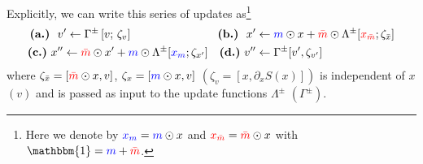 \documentclass[a4paper,11pt]{article}
\newcommand{\mask}{\textcolor{blue}{{m}}}
\newcommand{\maskbar}{\textcolor{red}{\bar{m}}}
\newcommand{\xmask}{\textcolor{blue}{{x}_{m}}}
\newcommand{\xmaskbar}{\textcolor{red}{x_{\bar{m}}}}
\begin{document}
Explicitly, we can write this series of updates as\footnote{%
  Here we denote by \(\xmask = \mask \odot x\) and 
  \(\xmaskbar = \maskbar \odot x\) with \(\mathbbm{1} = \mask + \maskbar\).
}
%
\begin{align}
    \nonumber
    \textbf{(a.)}\,\,\,\, v' 
        \gets \Gamma^{\pm}\left[v;\, \zeta_{v} \right]\hspace{75pt}
    \textbf{(b.)}\,\,\,\, x' 
        &\gets \mask \odot x + \maskbar \odot \Lambda^{\pm} [\xmaskbar; \zeta_{\bar{x}}] \\
    \nonumber
    \textbf{(c.)}\,\, x'' 
        \gets \maskbar \odot x' + \mask \odot \Lambda^{\pm} [\xmask; \zeta_{x'}] \quad
    \textbf{(d.)}\,\, v'' 
        &\gets \Gamma^{\pm} [v', \zeta_{v'}]
\end{align}
%
where \(\zeta_{\bar{x}} = [\maskbar\odot x, v]\), \(\zeta_{x} = [\mask \odot x,
v]\) \((\zeta_{v} = [x, \partial_{x} S(x)])\) is independent of \(x\) \((v)\)
and is passed as input to the update functions \(\Lambda^{\pm}\)
\((\Gamma^{\pm})\).
%
\end{document}
